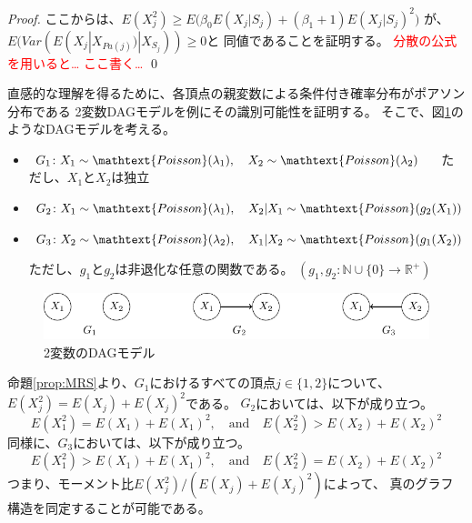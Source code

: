 \begin{proof}
  ここからは、$E(X_j^2) \geq E\bigl( \beta_0 E(X_j | S_j) +
  (\beta_1 + 1) E(X_j | S_j)^2 \bigl)$ が、
  $E(\mathit{Var}( E(X_j | X_{Pa(j)}) | X_{S_j} )) \geq 0$と
  同値であることを証明する。
  \textcolor{red}{分散の公式を用いると… ここ書く…}
  \qed

\end{proof}

直感的な理解を得るために、各頂点の親変数による条件付き確率分布がポアソン分布である
2変数DAGモデルを例にその識別可能性を証明する。
そこで、図\ref{fig:ex_bivariate}のようなDAGモデルを考える。

\begin{itemize}
  \item $G_1 \colon X_1 \sim \mathtext{Poisson}(\lambda_1),
         \quad X_2 \sim \mathtext{Poisson}(\lambda_2) \quad$ ただし、$X_1$と$X_2$は独立

  \item $G_2 \colon X_1 \sim \mathtext{Poisson}(\lambda_1),
         \quad X_2|X_1 \sim \mathtext{Poisson}(g_2(X_1))$

  \item $G_3 \colon X_2 \sim \mathtext{Poisson}(\lambda_2),
         \quad X_1|X_2 \sim \mathtext{Poisson}(g_1(X_2))$

  ただし、$g_1$と$g_2$は非退化な任意の関数である。
  $(g_1, g_2 \colon \mathbb{N} \cup \{ 0 \} \rightarrow \mathbb{R}^+)$
\end{itemize}

\begin{figure}[h]
  \centering
  \includegraphics{./picture/bivariate.pdf}
  \caption{2変数のDAGモデル}
  \label{fig:ex_bivariate}
\end{figure}

命題\ref{prop:MRS}より、$G_1$におけるすべての頂点$j \in \{ 1,2 \}$について、
$E(X_j^2) = E(X_j) + E(X_j)^2$である。
$G_2$においては、以下が成り立つ。
\begin{equation*}
  E(X_1^2) = E(X_1) + E(X_1)^2, \quad \text{and} \quad
  E(X_2^2) > E(X_2) + E(X_2)^2
\end{equation*}
同様に、$G_3$においては、以下が成り立つ。
\begin{equation*}
  E(X_1^2) > E(X_1) + E(X_1)^2, \quad \text{and} \quad
  E(X_2^2) = E(X_2) + E(X_2)^2
\end{equation*}
つまり、モーメント比$E(X_j^2) / (E(X_j) + E(X_j)^2)$によって、
真のグラフ構造を同定することが可能である。

